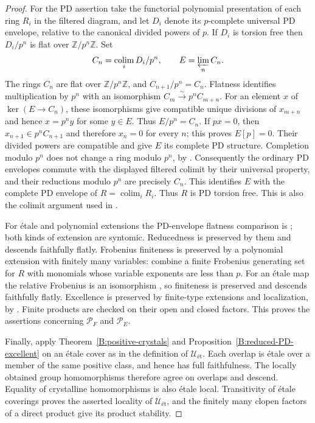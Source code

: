 \begin{proof}
For the PD assertion take the functorial polynomial presentation
of each ring $R_i$ in the filtered diagram, and let $D_i$ denote
its $p$-complete universal PD envelope, relative to the canonical
divided powers of $p$. If $D_i$ is torsion free then $D_i/p^n$ is
flat over $\mathbb Z/p^n\mathbb Z$. Set
\[
 C_n=\mathop{\operatorname{colim}}_i D_i/p^n,
 \qquad E=\varprojlim_n C_n.
\]
The rings $C_n$ are flat over $\mathbb Z/p^n\mathbb Z$, and
$C_{n+1}/p^n=C_n$. Flatness identifies multiplication by $p^n$
with an isomorphism $C_m\xrightarrow{\sim}p^nC_{m+n}$.
For an element $x$ of $\ker(E\to C_n)$, these isomorphisms give
compatible unique divisions of $x_{m+n}$ and hence $x=p^ny$
for some $y\in E$. Thus $E/p^n=C_n$. If $px=0$, then
$x_{n+1}\in p^nC_{n+1}$ and therefore $x_n=0$ for every $n$;
this proves $E[p]=0$.
Their divided powers are compatible and give $E$ its complete PD
structure. Completion modulo $p^n$ does not change a ring modulo
$p^n$, by \cite[Lemma 10.96.3, Tag 05GG]{B:StacksCompletion}.
Consequently the ordinary PD envelopes commute with the displayed
filtered colimit by their universal property, and their reductions
modulo $p^n$ are precisely $C_n$. This identifies
$E$ with the complete PD envelope of
$R=\operatorname{colim}_iR_i$. Thus $R$ is PD torsion free.
This is also the colimit argument used in
\cite[proof of Theorem 7.9]{B:LauDivided}.

For \'etale and polynomial extensions the PD-envelope flatness
comparison is \cite[Lemma 4.7 and Corollary 4.8]{B:LauDivided};
both kinds of extension are syntomic. Reducedness is preserved
by them and descends faithfully flatly. Frobenius finiteness is
preserved by a polynomial extension with finitely many variables:
combine a finite Frobenius generating set for $R$ with monomials
whose variable exponents are less than $p$. For an \'etale map the
relative Frobenius is an isomorphism
\cite[Lemma 41.14.3, Tag 0EBS]{B:StacksFrobenius}, so finiteness is preserved
and descends faithfully flatly. Excellence is preserved by finite-type
extensions and localization, by
\cite[Lemma 15.53.2, Tag 07QS]{B:StacksExcellent}.
Finite products are checked on their
open and closed factors. This proves the assertions concerning
$\mathcal P_F$ and $\mathcal P_E$.

Finally, apply Theorem~\ref{B:positive-crystals} and
Proposition~\ref{B:reduced-PD-excellent} on an \'etale cover as in
the definition of $\mathcal U_{\text{ét}}$. Each overlap
is \'etale over a member of the same positive class, and hence
has full faithfulness. The locally obtained group homomorphisms
therefore agree on overlaps and descend. Equality of crystalline
homomorphisms is also \'etale local. Transitivity of \'etale
coverings proves the asserted locality of
$\mathcal U_{\text{ét}}$, and the finitely many clopen
factors of a direct product give its product stability.
\end{proof}

